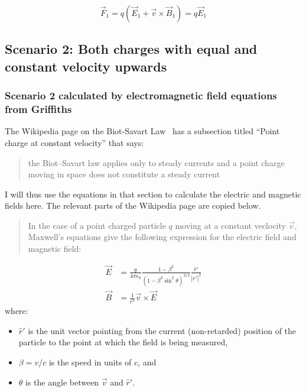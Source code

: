 \documentclass[a4paper]{article}
\theoremstyle{plain}
\theoremstyle{definition}
\newcommand{\rhat}{\hat{r}}
\newcommand{\vect}[1]{\vec{#1}}
\begin{document}
\begin{equation}
\vect{F}_1 = q(\vect{E}_1 + \vect{v} \times \vect{B}_1)
           = q \vect{E}_1   \label{eq:F1}
\end{equation}


\subsection{Scenario 2: Both charges with equal and constant velocity upwards}

\subsubsection{Scenario 2 calculated by electromagnetic field equations from Griffiths}

The Wikipedia page on the Biot-Savart
Law~\cite{EMFieldFromPointCharge} has a subsection titled ``Point
charge at constant velocity'' that says:

\begin{quote}
the Biot–Savart law applies only to steady currents and a point charge
moving in space does not constitute a steady current
\end{quote}

I will thus use the equations in that section to calculate the
electric and magnetic fields here.  The relevant parts of the
Wikipedia page are copied below.

\begin{quote}
In the case of a point charged particle $q$ moving at a constant
veclocity $\vect{v}$, Maxwell's equations give the following
expression for the electric field and magnetic field:
\end{quote}
\begin{align}
\vect{E} & = \frac{q}{4 \pi \epsilon_0} \frac{1-\beta^2}{(1-\beta^2 \sin^2 \theta)^{3/2}} \frac{{\rhat}'}{|r'|^2} \label{eq:EforPtChg} \\
\vect{B} & = \frac{1}{c^2} \vect{v} \times \vect{E} \label{eq:BforPtChg}
\end{align}
where:
\begin{itemize}
    \item ${\rhat}'$ is the unit vector pointing from the current
      (non-retarded) position of the particle to the point at which
      the field is being measured,
    \item $\beta = v/c$ is the speed in units of $c$, and
    \item $\theta$ is the angle between $\vect{v}$ and ${\rhat}'$.
\end{itemize}
\end{document}
